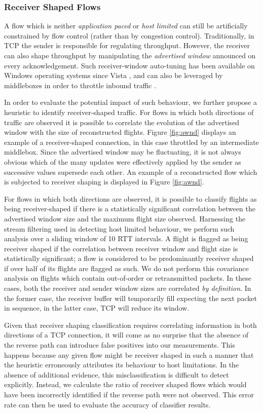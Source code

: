 \subsubsection{Receiver Shaped Flows}
\label{sssec:rec}

A flow which is neither \emph{application paced} or \emph{host limited} can still be artificially constrained by flow control (rather than by congestion control).
Traditionally, in TCP the sender is responsible for regulating throughput. 
However, the receiver can also shape throughput by manipulating the \emph{advertised window} announced on every acknowledgement.
Such receiver-window auto-tuning has been available on Windows operating systems since Vista \cite{vistaReceiveWindow}, and can also be leveraged by middleboxes in order to throttle inbound traffic \cite{appEx}.

In order to evaluate the potential impact of such behaviour, we further propose a heuristic to identify receiver-shaped traffic.
For flows in which both directions of traffic are observed it is possible to correlate the evolution of the advertised window with the size of reconstructed flights.
Figure \ref{fig:awnd} displays an example of a receiver-shaped connection, in this case throttled by an intermediate middlebox.
Since the advertised window may be fluctuating, it is not always obvious which of the many updates were effectively applied by the sender as successive values supersede each other.
An example of a reconstructed flow which is subjected to receiver shaping is displayed in Figure \ref{fig:awnd}.

For flows in which both directions are observed, it is possible to classify flights as being receiver-shaped if there is a statistically significant correlation between the advertised window size and the maximum flight size observed.
Harnessing the stream filtering used in detecting host limited behaviour, we perform such analysis over a sliding window of 10 RTT intervals.
A flight is flagged as being receiver shaped if the correlation between receiver window and flight size is statistically significant; a flow is considered to be predominantly receiver shaped if over half of its flights are flagged as such.
We do not perform this covariance analysis on flights which contain out-of-order or retransmitted packets. 
In these cases, both the receiver and sender window sizes are correlated \emph{by definition}. 
In the former case, the receiver buffer will temporarily fill expecting the next packet in sequence, in the latter case, TCP will reduce its window.

Given that receiver shaping classification requires correlating information in both directions of a TCP connection, it will come as no surprise that the absence of the reverse path can introduce false positives into our measurements. 
This happens because any given flow might be receiver shaped in such a manner that the heuristic erroneously attributes its behaviour to host limitations. 
In the absence of additional evidence, this misclassification is difficult to detect explicitly. 
Instead, we calculate the ratio of receiver shaped flows which would have been incorrectly identified if the reverse path were not observed. 
This error rate can then be used to evaluate the accuracy of classifier results.
